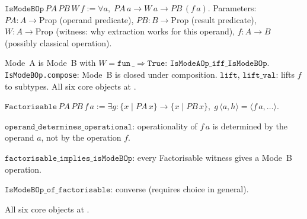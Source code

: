 \begin{definition}
\label{def:IsModeBOp}
\leanok
{}
$\texttt{IsModeBOp}\,PA\,PB\,W\,f := \forall a,\; PA\,a \to W\,a \to PB\,(f\,a)$.
Parameters: $PA : A \to \mathrm{Prop}$ (operand predicate),
$PB : B \to \mathrm{Prop}$ (result predicate),
$W : A \to \mathrm{Prop}$ (witness: why extraction works for this operand),
$f : A \to B$ (possibly classical operation).

Mode~A is Mode~B with $W = \texttt{fun}\,\_ \Rightarrow \texttt{True}$:
$\texttt{IsModeAOp\_iff\_IsModeBOp}$.
\texttt{IsModeBOp.compose}: Mode~B is closed under composition.
$\texttt{lift}$, $\texttt{lift\_val}$: lifts $f$ to subtypes.
All six core objects at \axiomprofile{[]}.
\end{definition}

\begin{definition}
\label{def:Factorisable}
\leanok
{}
$\texttt{Factorisable}\,PA\,PB\,f\,a :=
\exists g : \{x \mid PA\,x\} \to \{x \mid PB\,x\},\;
g\,\langle a, h \rangle = \langle f\,a, \ldots \rangle$.

$\texttt{operand\_determines\_operational}$: operationality of $f\,a$ is
determined by the operand $a$, not by the operation $f$.

$\texttt{factorisable\_implies\_isModeBOp}$: every Factorisable witness
gives a Mode~B operation.

$\texttt{IsModeBOp\_of\_factorisable}$: converse (requires choice in general).

All six core objects at \axiomprofile{[]}.
\end{definition}

